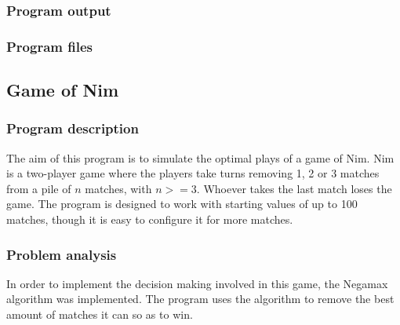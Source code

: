 \documentclass{article}
\begin{document}
\subsubsection*{Program output}










\subsubsection*{Program files}



\subsection*{Game of Nim}
\subsubsection*{Program description}

The aim of this program is to simulate the optimal plays of a game of Nim. Nim is a two-player game where the players take turns removing 1, 2 or 3 matches from a pile of $n$ matches, with $n >= 3$. Whoever takes the last match loses the game. The program is designed to work with 
starting values of up to 100 matches, though it is easy to configure it for more matches.

\subsubsection*{Problem analysis}
In order to implement the decision making involved in this game, the Negamax algorithm was implemented. The program uses the algorithm to remove the best amount of matches it can so as to win. 
\end{document}
